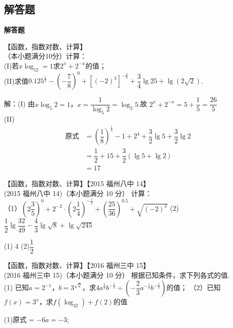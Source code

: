   \subsection{解答题}\begin{exercise}{\bf 解答题}
    \item 【函数，指数对数、计算】\\
      （本小题满分10分）计算：\\
      (I)若$x\log_52=1$求$2^x+2^{-x}$的值；\\
      (II)求值$0.125^{\frac{1}3}-(-\dfrac78)^0+[(-2)^3]^{-\frac43}+\dfrac{3}4\lg 25+\lg(2\sqrt2)$.\\
      \begin{answer}
        解：(I) 由$x\log_5 2=1$，$x=\dfrac{1}{\log_5 2}=\log_2 5$.故
        $2^x+2^{-x}=5+\dfrac15=\dfrac{26}5$\\
        (II)
        \begin{equation*}
          \begin{align}
            \text{原式}
            &=(\dfrac18)^{\frac13}-1+2^4+\dfrac32\lg{5}+\dfrac32\lg2\\
            &=\dfrac12+15+\dfrac32(\lg5+\lg2)\\
            &=17
          \end{align}
        \end{equation*}
      \end{answer}
    \item 【函数，指数对数、计算】【2015 福州八中 14】\\
      (2015 福州八中 14)（本小题满分 10 分）
      计算：\\
      （1）$\displaystyle (2\dfrac{3}{5})^0+2^{-2}\cdot(2\dfrac14)^{-\frac12}+(\dfrac{25}{36})^{0.5}+\sqrt{(-2)^2} $
      \hspace{5em}
      (2)$\displaystyle \dfrac12 \lg{\dfrac{32}{49}}-\dfrac43\lg{\sqrt 8}+\lg{\sqrt {245}} $
      \begin{answer}
        (1) 4 (2)$\dfrac12$
      \end{answer}
    \item 【函数，指数对数、计算】【2016 福州三中 15】\\
      (2016 福州三中 15)（本小题满分 10 分） 根据已知条件，求下列各式的值.\\
      (1) 已知$a=2^{-1}$，$b=3^{\sqrt2}$，求$4a^{\frac23}b^{-\frac13}\div(-\dfrac23a^{-\frac13}b^{-\frac13})$的值；
      （2）已知$f(x)=3^x$，求$f(\log_32)+f(2)$的值
      \begin{answer}
        (1)原式 = $-6a=-3$;

\end{answer}
\end{exercise}
